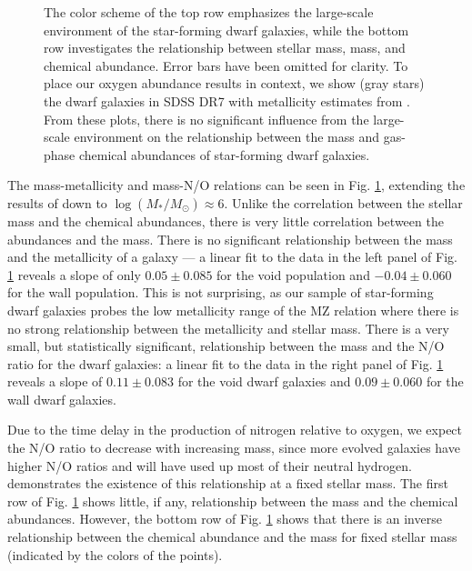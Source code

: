 \begin{figure}
{    The color scheme of the top row emphasizes the large-scale environment of 
    the star-forming dwarf galaxies, while the bottom row investigates the 
    relationship between stellar mass,  mass, and chemical abundance.  
    Error bars have been omitted for clarity.  To place our oxygen abundance 
    results in context, we show (gray stars) the dwarf galaxies in SDSS DR7 with 
    metallicity estimates from \cite{Tremonti04}.  From these plots, there is no 
    significant influence from the large-scale environment on the relationship 
    between the  mass and gas-phase chemical abundances of 
    star-forming dwarf galaxies.}
    \label{fig:HI}
\end{figure}

The  mass-metallicity and  mass-N/O relations can be seen in 
Fig. \ref{fig:HI}, extending the results of \cite{Bothwell13} down to 
$\log(M_*/M_\odot) \approx 6$.  Unlike the correlation between the stellar mass 
and the chemical abundances, there is very little correlation between the 
abundances and the  mass.  There is no significant relationship 
between the  mass and the metallicity of a galaxy --- a linear fit to 
the data in the left panel of Fig. \ref{fig:HI} reveals a slope of only 
$0.05\pm 0.085$ for the void population and $-0.04\pm 0.060$ for the wall 
population.  This is not surprising, as our sample of star-forming dwarf 
galaxies probes the low metallicity range of the MZ relation where there is no 
strong relationship between the metallicity and stellar mass.  There is a very 
small, but statistically significant, relationship between the  mass 
and the N/O ratio for the dwarf galaxies: a linear fit to the data in the right 
panel of Fig. \ref{fig:HI} reveals a slope of $0.11\pm 0.083$ for the void dwarf 
galaxies and $0.09\pm 0.060$ for the wall dwarf galaxies.

Due to the time delay in the production of nitrogen relative to oxygen, we 
expect the N/O ratio to decrease with increasing  mass, since more 
evolved galaxies have higher N/O ratios and will have used up most of their 
neutral hydrogen.  \cite{Bothwell13} demonstrates the existence of this 
relationship at a fixed stellar mass.  The first row of Fig. \ref{fig:HI} shows 
little, if any, relationship between the  mass and the chemical 
abundances.  However, the bottom row of Fig. \ref{fig:HI} shows that there is an 
inverse relationship between the chemical abundance and the  mass for 
fixed stellar mass (indicated by the colors of the points).


